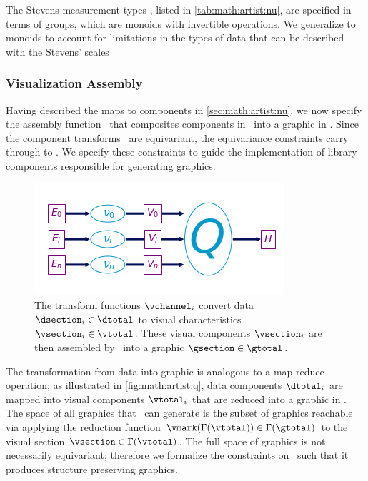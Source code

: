 \documentclass[../main.tex]{subfiles}
\begin{document}
The Stevens measurement types \cite{stevensTheoryScalesMeasurement1946}, listed in \autoref{tab:math:artist:nu}, are specified in terms of groups, which are monoids with invertible operations\cite{remlingAlgebraMath5353}. We generalize to monoids to account for limitations in the types of data that can be described with the Stevens' scales \cite{johnsonPseudoMathematicsMentalSocial1936,thomasMathematizationNotMeasurement2014} 

\subsubsection{Visualization Assembly}
Having described the maps to components in \autoref{sec:math:artist:nu}, we now specify the assembly function \vmarkd\ that composites components in \vtotal\ into a graphic in \gtotal. Since the component transforms \vchannel\ are equivariant, the equivariance constraints carry through to \vmarkd. We specify these constraints to guide the implementation of library components responsible for generating graphics. 

\label{sec:math:artist:q}
\begin{figure}[htb]
  \centering
  \includegraphics[width=\textwidth]{figures/math/path_of_q.png}
  \caption{The transform functions $\vchannel_i$ convert data $\dsection_i\in \dtotal$ to visual characteristics $\vsection_i \in \vtotal$. These visual components $\vsection_i$ are then assembled by \vmark\ into a graphic $\gsection \in \gtotal$.} 
  \label{fig:math:artist:q}
\end{figure}
The transformation from data into graphic is analogous to a map-reduce operation; as illustrated in \autoref{fig:math:artist:q}, data components $\dtotal_{i}$ are mapped into visual components $\vtotal_{i}$ that are reduced into a graphic in \gtotal. The space of all graphics that \vmark\ can generate is the subset of graphics reachable via applying the reduction function $\vmark(\Gamma(\vtotal)) \in \Gamma(\gtotal)$ to the visual section $\vsection \in \Gamma(\vtotal)$. The full space of graphics is not necessarily equivariant; therefore we formalize the constraints on \vmark\ such that it produces structure preserving graphics. 
\end{document}
